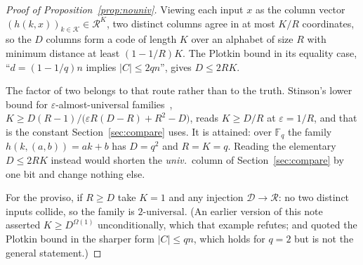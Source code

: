 \documentclass{aicr-solution}
\newcommand{\calK}{\mathcal{K}}
\newcommand{\calD}{\mathcal{D}}
\newcommand{\calR}{\mathcal{R}}
\begin{document}
\begin{proof}[Proof of Proposition~\ref{prop:nouniv}]
Viewing each input $x$ as the column vector $(h(k,x))_{k \in \calK} \in \calR^{K}$, two distinct
columns agree in at most $K/R$ coordinates, so the $D$ columns form a code of length $K$ over an
alphabet of size $R$ with minimum distance at least $(1 - 1/R)K$. The Plotkin bound in its
equality case, ``$d = (1-1/q)n$ implies $|C| \le 2qn$'', gives $D \le 2RK$.

The factor of two belongs to that route rather than to the truth. Stinson's lower bound for
$\varepsilon$-almost-universal families~\cite{Sti94},
$K \ge D(R-1)/\bigl(\varepsilon R(D-R) + R^{2} - D\bigr)$, reads $K \ge D/R$ at
$\varepsilon = 1/R$, and that is the constant Section~\ref{sec:compare} uses. It is attained: over
$\mathbb{F}_q$ the family $h(k,(a,b)) = ak+b$ has $D = q^{2}$ and $R = K = q$. Reading the
elementary $D \le 2RK$ instead would shorten the \emph{univ.}\ column of
Section~\ref{sec:compare} by one bit and change nothing else.

For the proviso, if $R \ge D$ take
$K = 1$ and any injection $\calD \to \calR$: no two distinct inputs collide, so the family is
$2$-universal. (An earlier version of this note asserted $K \ge D^{\Omega(1)}$ unconditionally,
which that example refutes; and quoted the Plotkin bound in the sharper form $|C| \le qn$, which
holds for $q = 2$ but is not the general statement.)
\end{proof}
\end{document}
